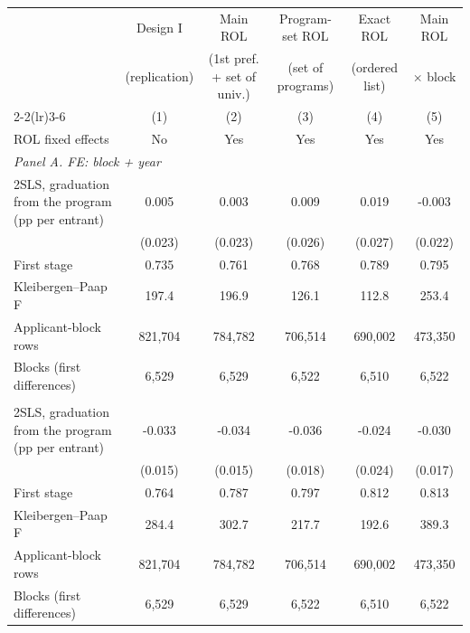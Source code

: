 \begin{tabular}{l*{5}{c}}
\toprule
 & Design I & Main ROL & Program-set ROL & Exact ROL & Main ROL \\
 & (replication) & (1st pref. + set of univ.) & (set of programs) & (ordered list) & \(\times\) block \\
\cmidrule(lr){2-2}\cmidrule(lr){3-6}
 & (1) & (2) & (3) & (4) & (5) \\
ROL fixed effects & No & Yes & Yes & Yes & Yes \\
\midrule
\multicolumn{6}{l}{\textit{Panel A. FE: block + year}} \\
2SLS, graduation from the program (pp per entrant) &   0.005 &   0.003 &   0.009 &   0.019 &  -0.003 \\
 & (0.023) & (0.023) & (0.026) & (0.027) & (0.022) \\
First stage &  0.735 &  0.761 &  0.768 &  0.789 &  0.795 \\
Kleibergen--Paap F &  197.4 &  196.9 &  126.1 &  112.8 &  253.4 \\
Applicant-block rows &    821,704 &    784,782 &    706,514 &    690,002 &    473,350 \\
Blocks (first differences) &  6,529 &  6,529 &  6,522 &  6,510 &  6,522 \\
\addlinespace
\multicolumn{6}{l}{\textit{Panel B. FE: block + university \(\times\) year}} \\
2SLS, graduation from the program (pp per entrant) &  -0.033\sym{**} &  -0.034\sym{**} &  -0.036\sym{**} &  -0.024 &  -0.030\sym{*} \\
 & (0.015) & (0.015) & (0.018) & (0.024) & (0.017) \\
First stage &  0.764 &  0.787 &  0.797 &  0.812 &  0.813 \\
Kleibergen--Paap F &  284.4 &  302.7 &  217.7 &  192.6 &  389.3 \\
Applicant-block rows &    821,704 &    784,782 &    706,514 &    690,002 &    473,350 \\
Blocks (first differences) &  6,529 &  6,529 &  6,522 &  6,510 &  6,522 \\
\bottomrule
\end{tabular}
